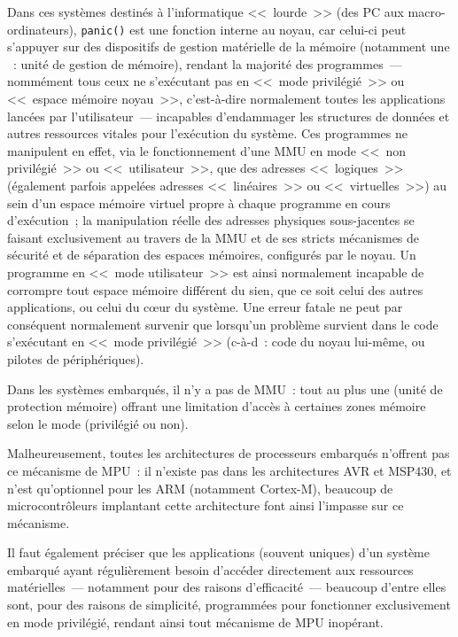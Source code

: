 Dans ces systèmes destinés à l'informatique <<~lourde~>> (des PC
aux macro-ordinateurs), \texttt{panic()} est une fonction interne
au noyau, car celui-ci peut s'appuyer sur des dispositifs de gestion
matérielle de la mémoire (notamment une ~: unité de gestion
de mémoire), rendant la majorité des programmes~--- nommément
tous ceux ne s'exécutant pas en <<~mode privilégié~>> ou <<~espace
mémoire noyau~>>, c'est-à-dire normalement toutes les applications
lancées par l'utilisateur~--- incapables d'endammager les structures
de données et autres ressources vitales pour l'exécution du système.
Ces programmes ne manipulent en effet, via le fonctionnement d'une MMU
en mode <<~non privilégié~>> ou <<~utilisateur~>>, que des adresses
<<~logiques~>> (également parfois appelées adresses <<~linéaires~>> ou
<<~virtuelles~>>) au sein d'un espace mémoire virtuel propre à chaque
programme en cours d'exécution~; la manipulation réelle des adresses
physiques sous-jacentes se faisant exclusivement au travers de la MMU et
de ses stricts mécanismes de sécurité et de séparation des espaces mémoires,
configurés par le noyau. Un programme en <<~mode utilisateur~>> est ainsi
normalement incapable de corrompre tout espace mémoire différent du sien,
que ce soit celui des autres applications, ou  celui du
c{\oe}ur du système.
Une erreur fatale ne peut par conséquent normalement survenir que lorsqu'un
problème survient dans le code s'exécutant en <<~mode privilégié~>>
(c-à-d~: code du noyau lui-même, ou pilotes de périphériques).

\smallskip

Dans les systèmes embarqués, il n'y a pas de MMU~: tout au plus
une  (unité de protection mémoire) offrant une limitation d'accès
à certaines zones mémoire selon le mode (privilégié ou non).

Malheureusement, toutes les architectures de processeurs embarqués
n'offrent pas ce mécanisme de MPU~: il n'existe pas dans les
architectures AVR et MSP430, et n'est qu'optionnel pour les ARM
(notamment Cortex-M), beaucoup de microcontrôleurs implantant cette
architecture font ainsi l'impasse sur ce mécanisme.

Il faut également préciser que les applications (souvent uniques) d'un
système embarqué ayant régulièrement besoin d'accéder directement aux
ressources matérielles~--- notamment pour des raisons d'efficacité~---
beaucoup d'entre elles sont, pour des raisons de simplicité, programmées
pour fonctionner exclusivement en mode privilégié, rendant ainsi tout
mécanisme de MPU inopérant.

